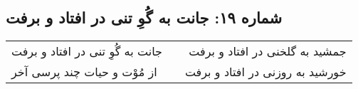 \begin{center}
\section*{شماره ۱۹: جانت به گُوِ تنی در افتاد و برفت}
\label{sec:019}
\begin{longtable}{l p{0.5cm} r}
جانت به گُوِ تنی در افتاد و برفت
&&
جمشید به گلخنی در افتاد و برفت
\\
از مُوْت و حیات چند پرسی آخر
&&
خورشید به روزنی در افتاد و برفت
\\
\end{longtable}
\end{center}
